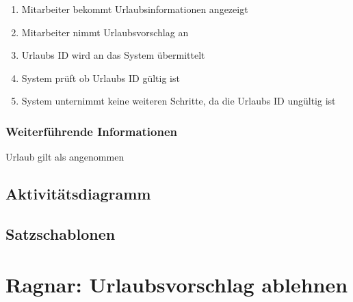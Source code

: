 \begin{enumerate}
	\item Mitarbeiter bekommt Urlaubsinformationen angezeigt
	\item Mitarbeiter nimmt Urlaubsvorschlag an
	\item Urlaubs ID wird an das System übermittelt
	\item System prüft ob Urlaubs ID gültig ist
	\item System unternimmt keine weiteren Schritte, da die Urlaubs ID ungültig ist
\end{enumerate}


\subsubsection{Weiterführende Informationen}
Urlaub gilt als angenommen

\subsection{Aktivitätsdiagramm}

\begin{center}
\end{center}

\subsection{Satzschablonen}


\section{Ragnar: Urlaubsvorschlag ablehnen}

 
